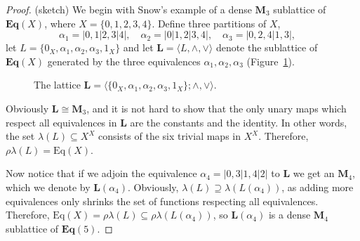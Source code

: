 \documentclass[cm,dissertation]{uhthesis}
\theoremstyle{plain}
\theoremstyle{definition}
\theoremstyle{remark}
\numberwithin{theorem}{section}
\numberwithin{claim}{chapter}
\numberwithin{equation}{section}
\numberwithin{conjecture}{chapter}
\newcommand{\<}{\ensuremath{\langle}}
\renewcommand{\>}{\ensuremath{\rangle}}
\newcommand{\meet}{\ensuremath{\wedge}}
\newcommand{\join}{\ensuremath{\vee}}
\newcommand{\Eq}{\ensuremath{\mathrm{Eq}}}
\newcommand{\bEq}{\ensuremath{\mathbf{Eq}}}
\newcommand{\0}{\ensuremath{\mathbf{0}}}
\newcommand{\1}{\ensuremath{\mathbf{1}}}
\newcommand{\2}{\ensuremath{\mathbf{2}}}
\newcommand{\3}{\ensuremath{\mathbf{3}}}
\newcommand{\4}{\ensuremath{\mathbf{4}}}
\newcommand{\5}{\ensuremath{\mathbf{5}}}
\newcommand{\bL}{\ensuremath{\mathbf{L}}}
\newcommand{\bM}{\ensuremath{\mathbf{M}}}
\begin{document}
\begin{proof} (sketch)
We begin with Snow's example of a dense $\bM_3$ sublattice of $\bEq(X)$, where 
$X =  \{0,1,2,3,4\}$.  
Define three partitions of $X$,
\[
\alpha_1 = |0,1|2,3|4|, \quad 
\alpha_2 = |0|1,2|3,4|, \quad 
\alpha_3 = |0,2,4|1,3|, \quad 
\]
let $L =\{0_X, \alpha_1, \alpha_2, \alpha_3, 1_X\}$ and let $\bL  = \<L, \meet, \join\>$ denote the 
sublattice of $\bEq(X)$ generated by the three equivalences $\alpha_1, \alpha_2,
\alpha_3$ (Figure~\ref{fig:diamondeq}).

\begin{figure}[centering,h]
\caption{The lattice $\bL  = \<\{ 0_X, \alpha_1, \alpha_2, \alpha_3, 1_X \};
  \meet, \join\>$.}
\label{fig:diamondeq}
\begin{center}
\end{center}
\end{figure}
\noindent Obviously $\bL \cong \bM_3$, and it is not hard to show that the only
unary maps which respect all equivalences in $\bL$ are the constants and the
identity.  In other words, the set $\lambda(L)\subseteq X^X$ consists of
the six trivial maps in $X^X$.   Therefore, $\rho \lambda(L) = \Eq(X)$.

Now notice that if we adjoin the equivalence $\alpha_4 = |0,3|1,4|2|$ to $\bL$ we get
an $\bM_4$, which we denote by $\bL(\alpha_4)$.  Obviously,
$\lambda(L) \supseteq \lambda(L(\alpha_4))$, as adding more equivalences
only shrinks the set of functions respecting all equivalences.
Therefore, $\Eq(X) = \rho \lambda(L) \subseteq \rho \lambda(L(\alpha_4))$, so
$\bL(\alpha_4)$ is a dense $\bM_4$ sublattice of $\bEq(5)$.


\end{proof}
\end{document}
